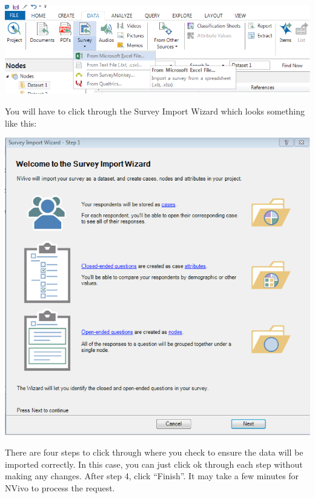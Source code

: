 \documentclass[
]{book}
\begin{document}
\includegraphics{imgs/excel_pc.png}

You will have to click through the Survey Import Wizard which looks something like this:

\includegraphics{imgs/import_wizard.png}

There are four steps to click through where you check to ensure the data will be imported correctly. In this case, you can just click ok through each step without making any changes. After step 4, click ``Finish''. It may take a few minutes for NVivo to process the request.
\end{document}

